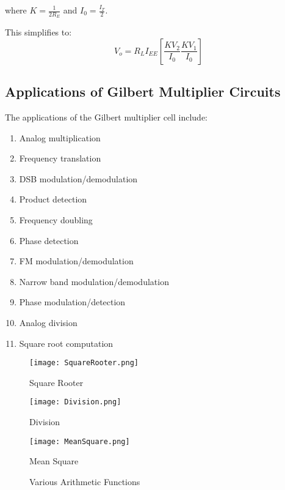 \documentclass[a4paper,9pt,twoside,openany,twocolumn]{memoir}
\begin{document}
where \( K = \frac{1}{2R_{E}} \) and \( I_{0} = \frac{I_{T}}{2} \).

This simplifies to:
\begin{equation}
V_o = R_L I_{EE} \left[\frac{K V_2}{I_0} \frac{K V_1}{I_0}\right] \tag{3}
\end{equation}

\subsection{Applications of Gilbert Multiplier Circuits}
The applications of the Gilbert multiplier cell include:
\begin{enumerate}
    \item Analog multiplication
    \item Frequency translation
    \item DSB modulation/demodulation
    \item Product detection
    \item Frequency doubling
    \item Phase detection
    \item FM modulation/demodulation
    \item Narrow band modulation/demodulation
    \item Phase modulation/detection
    \item Analog division
    \item Square root computation
\end{enumerate}
\begin{figure}[H]
    \centering
    \begin{minipage}[b]{0.3\textwidth}
        \centering
        \texttt{[image: SquareRooter.png]}
        \caption{Square Rooter}
        \label{fig:squarerooter}
    \end{minipage}%
    \hfill
    \begin{minipage}[b]{0.3\textwidth}
        \centering
        \texttt{[image: Division.png]}
        \caption{Division}
        \label{fig:division}
    \end{minipage}%
    \hfill
    \begin{minipage}[b]{0.3\textwidth}
        \centering
        \texttt{[image: MeanSquare.png]}
        \caption{Mean Square}
        \label{fig:meansquare}
    \end{minipage}

    \caption{Various Arithmetic Functions}
    \label{fig:three_images}
\end{figure}
\end{document}

